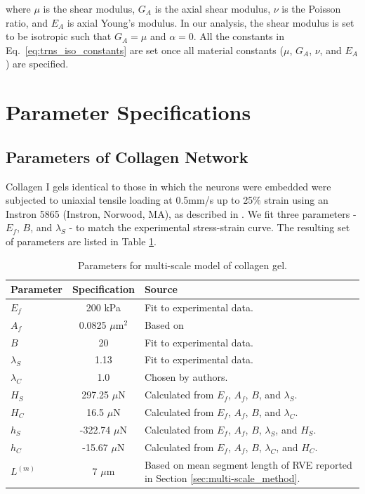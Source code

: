 \documentclass[]{interact}
\begin{document}
%
where $\mu$ is the shear modulus, $G_A$ is the axial shear modulus, $\nu$ is the Poisson ratio, and $E_A$ is axial Young's modulus. In our analysis, the shear modulus is set to be isotropic such that $G_A=\mu$ and $\alpha = 0$. All the constants in Eq.\ \eqref{eq:trns_iso_constants} are set once all material constants ($\mu$, $G_A$, $\nu$, and $E_A$) are specified. 

\section{Parameter Specifications}

\subsection{Parameters of Collagen Network}
Collagen I gels identical to those in which the neurons were embedded were subjected to uniaxial tensile loading at 0.5mm/s up to 25$\%$ strain using an Instron 5865 (Instron, Norwood, MA), as described in  \cite{Zhang:2016ga}. We fit three parameters - $E_f$, $B$, and $\lambda_S$ - to match the experimental stress-strain curve. The resulting set of parameters are listed in Table \ref{table:multi-scale_parameters}.
\begin{table}[ht]
\begin{center}
\begin{tabular}{ l c l }
\hline \hline
Parameter & Specification & Source \\
\hline 
$E_f$ & 200 kPa & Fit to experimental data. \\
$A_f$ & 0.0825 $\mu$m$^2$ & Based on \cite{Dutov:2016gu} \\
$B$ & 20 & Fit to experimental data. \\
$\lambda_S$ &1.13 & Fit to experimental data. \\
$\lambda_C$ & 1.0 & Chosen by authors. \\ 
$H_S$ & 297.25 $\mu$N & Calculated from $E_f$, $A_f$, $B$, and $\lambda_S$.\\
$H_C$ & 16.5 $\mu$N & Calculated from $E_f$, $A_f$, $B$, and $\lambda_C$. \\
$h_S$ & -322.74 $\mu$N & Calculated from $E_f$, $A_f$, $B$, $\lambda_S$, and $H_S$. \\
$h_C$ & -15.67 $\mu$N & Calculated from $E_f$, $A_f$, $B$, $\lambda_C$, and $H_C$. \\
$L^{(m)}$ & 7 $\mu$m & Based on mean segment length of RVE reported in Section \ref{sec:multi-scale_method}.\\ 
\hline \hline
\end{tabular}
\end{center}
\caption{Parameters for multi-scale model of collagen gel.}
\label{table:multi-scale_parameters}
\end{table}
\end{document}
